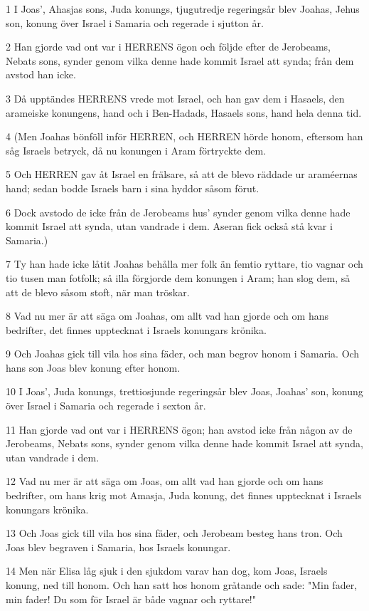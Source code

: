 \par 1 I Joas', Ahasjas sons, Juda konungs, tjugutredje regeringsår blev Joahas, Jehus son, konung över Israel i Samaria och regerade i sjutton år.
\par 2 Han gjorde vad ont var i HERRENS ögon och följde efter de Jerobeams, Nebats sons, synder genom vilka denne hade kommit Israel att synda; från dem avstod han icke.
\par 3 Då upptändes HERRENS vrede mot Israel, och han gav dem i Hasaels, den arameiske konungens, hand och i Ben-Hadads, Hasaels sons, hand hela denna tid.
\par 4 (Men Joahas bönföll inför HERREN, och HERREN hörde honom, eftersom han såg Israels betryck, då nu konungen i Aram förtryckte dem.
\par 5 Och HERREN gav åt Israel en frälsare, så att de blevo räddade ur araméernas hand; sedan bodde Israels barn i sina hyddor såsom förut.
\par 6 Dock avstodo de icke från de Jerobeams hus' synder genom vilka denne hade kommit Israel att synda, utan vandrade i dem. Aseran fick också stå kvar i Samaria.)
\par 7 Ty han hade icke låtit Joahas behålla mer folk än femtio ryttare, tio vagnar och tio tusen man fotfolk; så illa förgjorde dem konungen i Aram; han slog dem, så att de blevo såsom stoft, när man tröskar.
\par 8 Vad nu mer är att säga om Joahas, om allt vad han gjorde och om hans bedrifter, det finnes upptecknat i Israels konungars krönika.
\par 9 Och Joahas gick till vila hos sina fäder, och man begrov honom i Samaria. Och hans son Joas blev konung efter honom.
\par 10 I Joas', Juda konungs, trettiosjunde regeringsår blev Joas, Joahas' son, konung över Israel i Samaria och regerade i sexton år.
\par 11 Han gjorde vad ont var i HERRENS ögon; han avstod icke från någon av de Jerobeams, Nebats sons, synder genom vilka denne hade kommit Israel att synda, utan vandrade i dem.
\par 12 Vad nu mer är att säga om Joas, om allt vad han gjorde och om hans bedrifter, om hans krig mot Amasja, Juda konung, det finnes upptecknat i Israels konungars krönika.
\par 13 Och Joas gick till vila hos sina fäder, och Jerobeam besteg hans tron. Och Joas blev begraven i Samaria, hos Israels konungar.
\par 14 Men när Elisa låg sjuk i den sjukdom varav han dog, kom Joas, Israels konung, ned till honom. Och han satt hos honom gråtande och sade: "Min fader, min fader! Du som för Israel är både vagnar och ryttare!"

